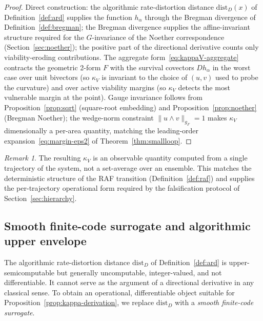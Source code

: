 \documentclass[11pt,a4paper]{article}
\theoremstyle{plain}
\theoremstyle{definition}
\theoremstyle{remark}
\newtheorem{remark}[theorem]{Remark}
\newcommand{\kk}{\kappa_{\!V}}
\newcommand{\distD}{\mathrm{dist}_{D}}
\begin{document}
\begin{proof}
Direct construction: the algorithmic rate-distortion distance
$\distD(x)$ of Definition~\ref{def:ard} supplies the function
$h_\alpha$ through the Bregman divergence of Definition~\ref{def:bregman}; the
Bregman divergence supplies the affine-invariant structure required for
the $G$-invariance of the Noether correspondence
(Section~\ref{sec:noether}); the positive part of the directional
derivative counts only viability-eroding contributions. The aggregate
form~\eqref{eq:kappaV-aggregate} contracts the geometric 2-form $F$
with the survival covectors $D h_\alpha$ in the worst case over unit
bivectors (so $\kk$ is invariant to the choice of $(u,v)$ used to
probe the curvature) and over active viability margins (so $\kk$
detects the most vulnerable margin at the point). Gauge
invariance follows from Proposition~\ref{prop:sqrt} (square-root
embedding) and Proposition~\ref{prop:noether} (Bregman Noether); the
wedge-norm constraint $\|u\wedge v\|_{g_F} = 1$ makes $\kk$
dimensionally a per-area quantity, matching the leading-order
expansion~\eqref{eq:margin-eps2} of Theorem~\ref{thm:smallloop}.
\end{proof}

\begin{remark}
The resulting $\kk$ is an observable quantity computed from a single
trajectory of the system, not a set-average over an ensemble. This
matches the deterministic structure of the RAF transition
(Definition~\ref{def:raf}) and supplies the per-trajectory operational
form required by the falsification protocol of
Section~\ref{sec:hierarchy}.
\end{remark}

\subsection{Smooth finite-code surrogate and algorithmic upper envelope}
\label{sec:ard-surrogate}

The algorithmic rate-distortion distance $\distD$ of
Definition~\ref{def:ard} is upper-semicomputable but generally
uncomputable, integer-valued, and not differentiable. It cannot serve
as the argument of a directional derivative in any classical sense.
To obtain an operational, differentiable object suitable for
Proposition~\ref{prop:kappa-derivation}, we replace $\distD$ with a
\emph{smooth finite-code surrogate}.
\end{document}
